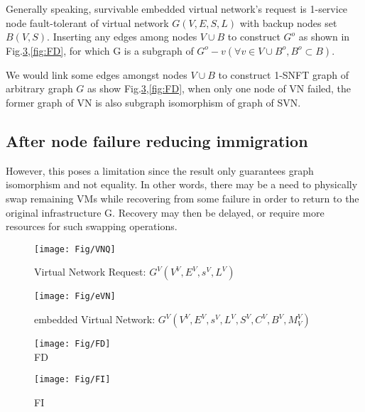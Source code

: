 Generally speaking, survivable embedded virtual network's request is 1-service node fault-tolerant of virtual network $G(V,E,S,L)$ with backup nodes set $B(V,S)$. Inserting any edges among nodes $V\cup B$ to construct $G^o$ as shown in Fig.\ref{fig:FI},\ref{fig:FD}, for which G is a subgraph of $G^o-v(\forall v\in V\cup B^o,B^o\subset B)$.

We would link some edges amongst nodes $V\cup B$ to construct 1-SNFT graph of arbitrary graph $G$ as show Fig.\ref{fig:FI},\ref{fig:FD}, when only one node of VN failed, the former graph of VN is also subgraph isomorphism of graph of SVN. %




\subsection{After node failure reducing immigration}
However, this poses a limitation since the result only guarantees graph isomorphism and not equality. In other words, there may be a need to physically swap remaining VMs while recovering from some failure in order to return to the original infrastructure G. Recovery may then be delayed, or require more resources for such swapping operations.





\begin{figure}
\centering
\texttt{[image: Fig/VNQ]}\\
\caption{Virtual Network Request: $G^V (V^V,E^V,s^V,L^V)$}\label{fig:VNQ}
\end{figure}

\begin{figure}
\centering
\texttt{[image: Fig/eVN]}\\
\caption{embedded Virtual Network: $G^V (V^V,E^V,s^V,L^V,S^V,C^V,B^V,M^V_V)$}\label{fig:eVN}
\end{figure}

\begin{figure}
\centering
\begin{minipage}[t]{0.5\linewidth}
\centering
\texttt{[image: Fig/FD]}\\
\caption{ FD}\label{fig:FD}
\end{minipage}
\hfill
\begin{minipage}[t]{0.5\linewidth}
\centering
\texttt{[image: Fig/FI]}\\
\caption{FI}\label{fig:FI}
\end{minipage}
\end{figure}




